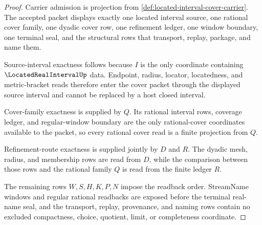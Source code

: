 \begin{proof}
Carrier admission is projection from \autoref{def:located-interval-cover-carrier}. The accepted packet displays exactly one located interval source, one rational cover family, one dyadic cover row, one refinement ledger, one window boundary, one terminal seal, and the structural rows that transport, replay, package, and name them.

Source-interval exactness follows because $I$ is the only coordinate containing $\LocatedRealIntervalUp$ data. Endpoint, radius, locator, locatedness, and metric-bracket reads therefore enter the cover packet through the displayed source interval and cannot be replaced by a host closed interval.

Cover-family exactness is supplied by $Q$. Its rational interval rows, coverage ledger, and regular-window boundary are the only rational-cover coordinates available to the packet, so every rational cover read is a finite projection from $Q$.

Refinement-route exactness is supplied jointly by $D$ and $R$. The dyadic mesh, radius, and membership rows are read from $D$, while the comparison between those rows and the rational family $Q$ is read from the finite ledger $R$.

The remaining rows $W,S,H,K,P,N$ impose the readback order. StreamName windows and regular rational readbacks are exposed before the terminal real-name seal, and the transport, replay, provenance, and naming rows contain no excluded compactness, choice, quotient, limit, or completeness coordinate.
\end{proof}

